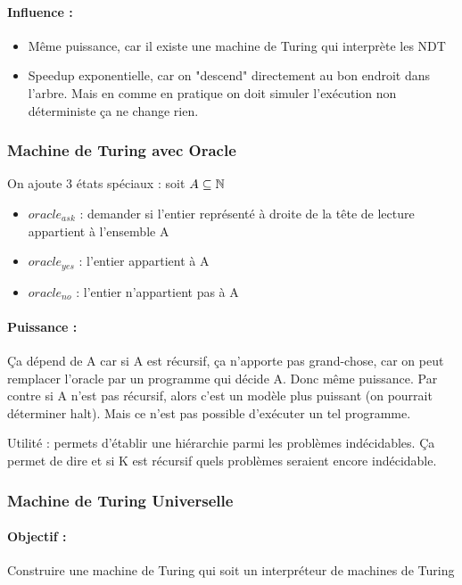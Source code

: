 \paragraph{Influence :} 
\begin{itemize}
	\item Même puissance, car il existe une machine de Turing qui interprète
	 les NDT 
	\item Speedup exponentielle, car on "descend" directement au bon endroit 
		dans l'arbre. Mais en comme en pratique on doit simuler 
		l'exécution non déterministe ça ne change rien.
\end{itemize}

\subsubsection{Machine de Turing avec Oracle}
On ajoute 3 états spéciaux : soit $A \subseteq \mathbb{N}$
\begin{itemize}
	\item $oracle_{ask}$ : demander si l'entier représenté à droite de la 
		tête de lecture appartient à l'ensemble A
	\item $oracle_{yes}$ : l'entier appartient à A
	\item $oracle_{no}$ :  l'entier n'appartient pas à A
\end{itemize}

\paragraph{Puissance :} Ça dépend de A car si A est récursif, ça n'apporte pas 
grand-chose, car on peut remplacer l'oracle par un programme qui décide A. Donc 
même puissance. Par contre si A n'est pas récursif, alors c'est un modèle plus 
puissant (on pourrait déterminer halt). Mais ce n’est pas possible d'exécuter un tel programme. 

\begin{myrem}
	Utilité : permets d'établir une hiérarchie parmi les problèmes 
	indécidables. Ça permet de dire et si K est récursif quels problèmes 
	seraient encore indécidable.
\end{myrem}

\subsubsection{Machine de Turing Universelle}

\paragraph{Objectif :} Construire une machine de Turing qui soit un 
interpréteur de machines de Turing

